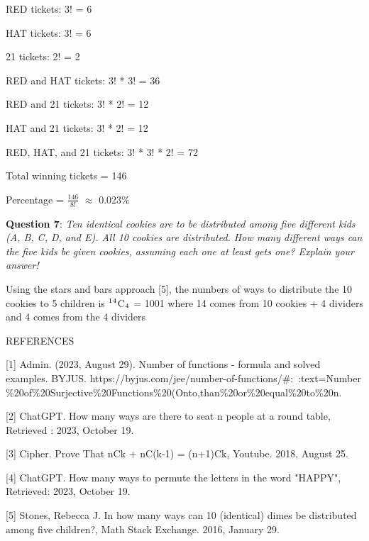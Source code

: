 \documentclass{article} %
\newcommand{\question}[2][]{\begin{flushleft}
        \textbf{Question #1}: \textit{#2}

\end{flushleft}}
\begin{document}
    RED tickets: 3! = 6

    HAT tickets: 3! = 6

    21 tickets: 2! = 2

    RED and HAT tickets: 3! * 3! = 36

    RED and 21 tickets: 3! * 2! = 12

    HAT and 21 tickets: 3! * 2! = 12

    RED, HAT, and 21 tickets: 3! * 3! * 2! = 72

    Total winning tickets = 146

    Percentage = $\frac{146}{8!}$ $\approx$ 0.023$\%$

    \question[7]{Ten identical cookies are to be distributed among five different kids (A, B, C, D, and E). All 10 cookies are distributed. How many different ways can the five kids be given cookies, assuming each one at least gets one? Explain your answer!}

    Using the stars and bars approach [5], the numbers of ways to distribute the 10 cookies to 5 children is $\textsuperscript{14}$C$\textsubscript{4}$ = 1001 where 14 comes from 10 cookies + 4 dividers and 4 comes from the 4 dividers

    \begin{center}
        REFERENCES
    \end{center}

    [1] Admin. (2023, August 29). Number of functions - formula and solved examples. BYJUS. https://byjus.com/jee/number-of-functions/$\#$:~:text=Number$\%$20of$\%$20Surjective$\%$20Functions$\%$20(Onto,than$\%$20or$\%$20equal$\%$20to$\%$20n.
    
    [2] ChatGPT. How many ways are there to seat n people at a round table, Retrieved : 2023, October 19. 

    [3] Cipher. Prove That nCk + nC(k-1) = (n+1)Ck, Youtube. 2018, August 25.

    [4] ChatGPT. How many ways to permute the letters in the word "HAPPY", Retrieved: 2023, October 19.

    [5] Stones, Rebecca J. In how many ways can 10 (identical) dimes be distributed among five children?, Math Stack Exchange. 2016, January 29.
\end{document}
